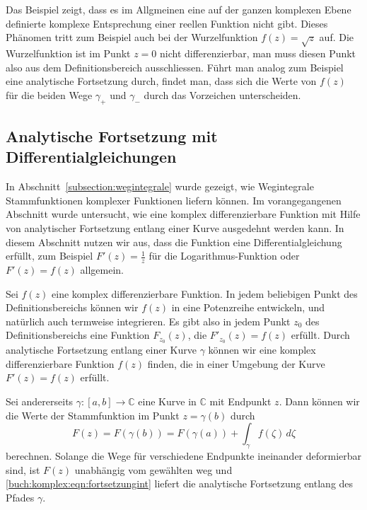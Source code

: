 Das Beispiel zeigt, dass es im Allgmeinen eine auf der ganzen komplexen
Ebene definierte komplexe Entsprechung einer reellen Funktion nicht gibt.
Dieses Phänomen tritt zum Beispiel auch bei der Wurzelfunktion
$f(z)=\sqrt{z}$ auf.
Die Wurzelfunktion ist im Punkt $z=0$ nicht differenzierbar, man muss diesen
Punkt also aus dem Definitionsbereich ausschliessen.
Führt man analog zum Beispiel eine analytische Fortsetzung durch,
findet man, dass sich die Werte von $f(z)$ für die beiden Wege $\gamma_+$
und $\gamma_-$ durch das Vorzeichen unterscheiden.

%
%
\subsection{Analytische Fortsetzung mit Differentialgleichungen
\label{komplex:analytische-fortsetzung-dgl}}
In Abschnitt~\ref{subsection:wegintegrale} wurde gezeigt, wie Wegintegrale
Stammfunktionen komplexer Funktionen liefern können.
Im vorangegangenen Abschnitt wurde untersucht, wie eine komplex differenzierbare
Funktion mit Hilfe von analytischer Fortsetzung entlang einer Kurve
ausgedehnt werden kann.
In diesem Abschnitt nutzen wir aus, dass die Funktion
eine Differentialgleichung erfüllt, zum Beispiel $F'(z)=\frac{1}{z}$
für die Logarithmus-Funktion oder $F'(z)=f(z)$ allgemein.

Sei $f(z)$ eine komplex differenzierbare Funktion.
In jedem beliebigen Punkt des Definitionsbereichs können wir $f(z)$
in eine Potenzreihe entwickeln, und natürlich auch termweise integrieren.
Es gibt also in jedem Punkt $z_0$ des Definitionsbereichs eine
Funktion $F_{z_0}(z)$, die $F'_{z_0}(z)=f(z)$ erfüllt.
Durch analytische Fortsetzung entlang einer Kurve $\gamma$ können
wir eine komplex differenzierbare Funktion $f(z)$ finden, die in einer
Umgebung der Kurve $F'(z)=f(z)$ erfüllt.

Sei andererseits $\gamma\colon[a,b]\to\mathbb C$ eine Kurve in $\mathbb C$
mit Endpunkt $z$.
Dann können wir die Werte der Stammfunktion im Punkt $z=\gamma(b)$ durch
\begin{equation}
F(z) = F(\gamma(b)) = F(\gamma(a))+\int_\gamma f(\zeta)\,d\zeta
\label{buch:komplex:eqn:fortsetzungint}
\end{equation}
berechnen.
Solange die Wege für verschiedene Endpunkte ineinander deformierbar sind,
ist $F(z)$ unabhängig vom gewählten weg und 
\eqref{buch:komplex:eqn:fortsetzungint}
liefert die analytische Fortsetzung entlang des Pfades $\gamma$.

